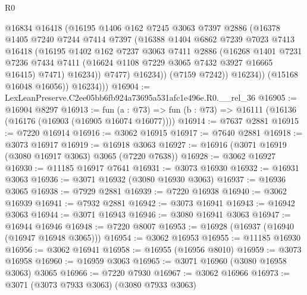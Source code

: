\begin{lexlean}{R0}
\begin{coremodule}
                    @16834
                    @16418
                    (@16195
                      @1406
                      @162
                      @7245
                      @3063
                      @7397
                      @2886
                      (@16378
                        @1405
                        @7240
                        @7244
                        @7414
                        @7397
                        (@16388
                          @1404
                          @6862
                          @7239
                          @7023
                          @7413
                          @16418
                          (@16195
                            @1402
                            @162
                            @7237
                            @3063
                            @7411
                            @2886
                            (@16268
                              @1401
                              @7231
                              @7236
                              @7434
                              @7411
                              (@16624 @1108 @7229 @3065 @7432 @3927 @16665 @16415)
                              @7471)
                            @16234))
                        @7477)
                      @16234))
                  (@7159 @7242))
                @16234))
            (@15168 @16048 @16056))
          @16234)))
@16904 := LexLeanPreserve.C2ee05bb6fb924a73695a531afc1e496e.R0.__rel_36
@16905 := @16904 @8297
@16913 := fun (a : @73) => fun (b : @73) => @16111 (@16136 (@16176 (@16903 (@16905 @16074 @16077))))
@16914 := @7637 @2881
@16915 := @7220 @16914
@16916 := @3062 @16915
@16917 := @7640 @2881
@16918 := @3073 @16917
@16919 := @16918 @3063
@16927 := @16916 (@3071 @16919 (@3080 @16917 @3063) @3065 (@7220 @7638))
@16928 := @3062 @16927
@16930 := @11185 @16917 @7641
@16931 := @3073 @16930
@16932 := @16931 @3063
@16936 := @3071 @16932 (@3080 @16930 @3063)
@16937 := @16936 @3065
@16938 := @7929 @2881
@16939 := @7220 @16938
@16940 := @3062 @16939
@16941 := @7932 @2881
@16942 := @3073 @16941
@16943 := @16942 @3063
@16944 := @3071 @16943
@16946 := @3080 @16941 @3063
@16947 := @16944 @16946
@16948 := @7220 @8007
@16953 := @16928 (@16937 (@16940 (@16947 @16948 @3065)))
@16954 := @3062 @16953
@16955 := @11185 @16930
@16956 := @3062 @16941
@16958 := @16955 (@16956 @8010)
@16959 := @3073 @16958
@16960 := @16959 @3063
@16965 := @3071 @16960 (@3080 @16958 @3063) @3065
@16966 := @7220 @7930
@16967 := @3062 @16966
@16973 := @3071 (@3073 @7933 @3063) (@3080 @7933 @3063)

\end{coremodule}
\end{lexlean}
